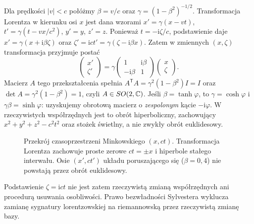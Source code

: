 \begin{przyklad}
Dla prędkości $|v|<c$ połóżmy $\beta=v/c$ oraz
$\gamma=(1-\beta^2)^{-1/2}$. Transformacja Lorentza
w kierunku osi $x$ jest dana wzorami
$x'=\gamma(x-vt)$,
$t'=\gamma(t-vx/c^2)$, $y'=y$, $z'=z$.
Ponieważ $t=-\mathrm{i}\zeta/c$, podstawienie daje
$x'=\gamma(x+\mathrm{i}\beta\zeta)$ oraz
$\zeta'=\mathrm{i}ct'
=\gamma(\zeta-\mathrm{i}\beta x)$.
Zatem w zmiennych $(x,\zeta)$ transformacja przyjmuje postać
\begin{equation}\label{eq:poincare-complex-boost}
 \begin{pmatrix}x'\\\zeta'\end{pmatrix}
 =\gamma\begin{pmatrix}
  1&\mathrm{i}\beta\\-\mathrm{i}\beta&1
 \end{pmatrix}
 \begin{pmatrix}x\\\zeta\end{pmatrix}.
\end{equation}
Macierz $A$ tego przekształcenia spełnia
$A^{\mathsf T}A=\gamma^2(1-\beta^2)I=I$ oraz
$\det A=\gamma^2(1-\beta^2)=1$, czyli $A\in SO(2,\mathbb{C})$.
Jeśli $\beta=\tanh\varphi$, to
$\gamma=\cosh\varphi$ i $\gamma\beta=\sinh\varphi$:
uzyskujemy obrotową macierz o \emph{zespolonym}
kącie $-\mathrm{i}\varphi$. W rzeczywistych
współrzędnych jest to obrót hiperboliczny, zachowujący
$x^2+y^2+z^2-c^2t^2$ oraz stożek świetlny,
a nie zwykły obrót euklidesowy.

\begin{figure}[htbp]
\centering
{}
\caption{Przekrój czasoprzestrzeni Minkowskiego $(x,ct)$.
Transformacja Lorentza zachowuje proste zerowe
$ct=\pm x$ i hiperbole stałego interwału. Osie
$(x',ct')$ układu poruszającego się ($\beta=0{,}4$)
nie powstają przez obrót euklidesowy.}
\label{fig:poincare-boost}
\end{figure}

Podstawienie $\zeta=\mathrm{i}ct$ nie jest zatem
rzeczywistą zmianą współrzędnych ani procedurą
usuwania osobliwości. Prawo bezwładności Sylvestera
wyklucza zamianę sygnatury lorentzowskiej na
riemannowską przez rzeczywistą zmianę bazy.
\end{przyklad}

